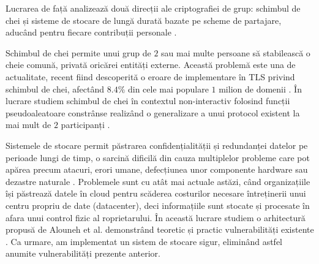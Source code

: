 \documentclass[oneside, 12pt]{book}
\begin{document}
\hspace*{5mm}Lucrarea de față analizează două direcții ale criptografiei de grup: schimbul de chei și sisteme de stocare de lungă durată bazate pe scheme de partajare, aducând pentru fiecare contribuții personale \cite{RD:2014, RD:2015}.

\hspace*{5mm}Schimbul de chei permite unui grup de $2$ sau mai multe persoane să stabilească o cheie comună, privată oricărei entități externe.
Această problemă este una de actualitate, recent fiind descoperită o eroare de implementare în TLS privind schimbul de chei, afectând $8.4 \%$ din cele mai populare $1$ milion de domenii \cite{adrianimperfect:2015}. În lucrare studiem schimbul de chei în contextul non-interactiv folosind funcții pseudoaleatoare constrânse realizând o generalizare a unui protocol existent la mai mult de $2$ participanți \cite{RD:2014}.

\hspace*{5mm}Sistemele de stocare permit păstrarea confidențialității și redundanței datelor pe perioade lungi de timp, o sarcină dificilă din cauza multiplelor probleme care pot apărea precum atacuri, erori umane, defecțiunea unor componente hardware sau dezastre naturale \cite{SGMV:2009}. Problemele sunt cu atât mai actuale astăzi, când organizațiile își păstrează datele în cloud pentru scăderea costurilor necesare întreținerii unui centru propriu de date (datacenter), deci informațiile sunt stocate și procesate în afara unui control fizic al roprietarului. În această lucrare studiem o arhitectură propusă de Alouneh et al. demonstrând teoretic și practic vulnerabilități existente \cite{RD:2015}. Ca urmare, am implementat un sistem de stocare sigur, eliminând astfel anumite vulnerabilități prezente anterior.

\end{document}
